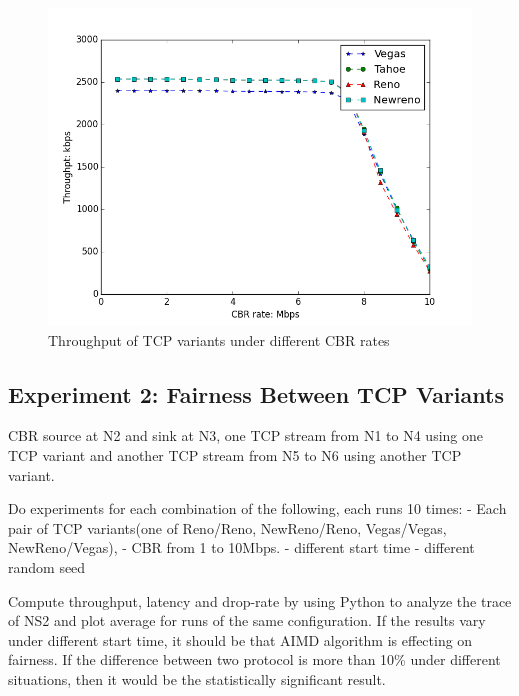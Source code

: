 \documentclass[10pt, conference]{IEEEtran/IEEEtran}
\begin{document}
\begin{figure}[htbp]
\begin{center}
\includegraphics[width=\linewidth]{../exp1/exp1_thpt.png}
\caption{Throughput of TCP variants under different CBR rates}
\label{exp1_thpt}
\end{center}
\end{figure}




\subsection{Experiment 2: Fairness Between TCP Variants}


CBR source at N2 and sink at N3, one TCP stream from N1 to N4 using one TCP
variant and another TCP stream from N5 to N6 using another TCP variant.

Do experiments for each combination of the following, each runs 10 times:
- Each pair of TCP variants(one of Reno/Reno, NewReno/Reno, Vegas/Vegas,
NewReno/Vegas), 
- CBR from 1 to 10Mbps.
- different start time
- different random seed

Compute throughput, latency and drop-rate by using Python to analyze the
trace of NS2 and plot average for runs of the same configuration. If the results
vary under different start time, it should be that AIMD algorithm is effecting on fairness.
If the difference between two protocol is more than 10\% under different situations, then it would be
the statistically significant result.

\end{document}

